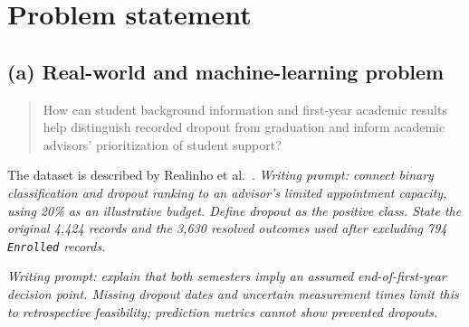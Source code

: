 \section{Problem statement}
\label{sec:problem-statement}

\subsection*{(a) Real-world and machine-learning problem}
\begin{quote}
How can student background information and first-year academic results help
distinguish recorded dropout from graduation and inform academic advisors'
prioritization of student support?
\end{quote}

The dataset is described by Realinho et al.~\cite{realinho2022}.
\emph{Writing prompt: connect binary classification and dropout ranking to an
advisor's limited appointment capacity, using 20\% as an illustrative budget.
Define dropout as the positive class. State the original 4,424 records and the
3,630 resolved outcomes used after excluding 794 \texttt{Enrolled} records.}

\emph{Writing prompt: explain that both semesters imply an assumed end-of-first-year
decision point. Missing dropout dates and uncertain measurement times limit this
to retrospective feasibility; prediction metrics cannot show prevented dropouts.}
